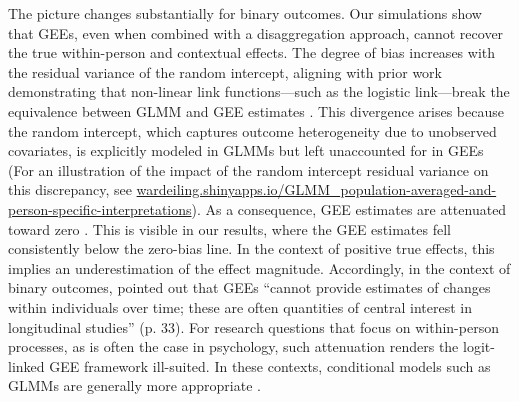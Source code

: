 \documentclass[stu]{apa7}
\begin{document}
The picture changes substantially for binary outcomes. Our simulations show that GEEs, even when combined with a disaggregation approach, cannot recover the true within-person and contextual effects. The degree of bias increases with the residual variance of the random intercept, aligning with prior work demonstrating that non-linear link functions—such as the logistic link—break the equivalence between GLMM and GEE estimates \parencite{neuhaus_comparison_1991, zeger_models_1988}. This divergence arises because the random intercept, which captures outcome heterogeneity due to unobserved covariates, is explicitly modeled in GLMMs but left unaccounted for in GEEs (For an illustration of the impact of the random intercept residual variance on this discrepancy, see \href{https://wardeiling.shinyapps.io/GLMM_population-averaged-and-person-specific-interpretations/}{wardeiling.shinyapps.io/GLMM\_population-averaged-and-person-specific-interpretations}). As a consequence, GEE estimates are attenuated toward zero \parencite{neuhaus_comparison_1991, zeger_models_1988}. This is visible in our results, where the GEE estimates fell consistently below the zero-bias line. In the context of positive true effects, this implies an underestimation of the effect magnitude. Accordingly, in the context of binary outcomes, \textcite[]{neuhaus_comparison_1991} pointed out that GEEs ``cannot provide estimates of changes within individuals over time; these are often quantities of central interest in longitudinal studies'' (p. 33). For research questions that focus on within-person processes, as is often the case in psychology, such attenuation renders the logit-linked GEE framework ill-suited. In these contexts, conditional models such as GLMMs are generally more appropriate \parencite[p. 78]{allison_logistic_1999}.

\end{document}
